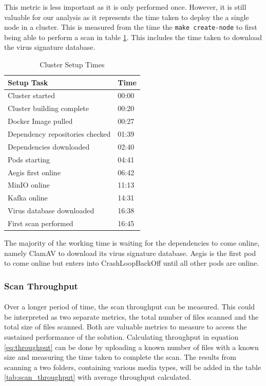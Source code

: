 \documentclass[12pt, conference, final, a4paper, onecolumn, compsoc]{IEEEtran}
\begin{document}
This metric is less important as it is only performed once. However, it is still
valuable for our analysis as it represents the time taken to deploy the a single
node in a cluster. This is measured from the time the \texttt{make create-node}
to first being able to perform a scan in table \ref{tab:setup_timings}. This
includes the time taken to download the virus signature database.

\begin{table}[H] \centering
  \begin{tabular}{|l|l|}
    \hline
    \textbf{Setup Task}             & \textbf{Time} \\ \hline
    Cluster started                 & 00:00         \\ \hline
    Cluster building complete       & 00:20         \\ \hline
    Docker Image pulled             & 00:27         \\ \hline
    Dependency repositories checked & 01:39         \\ \hline
    Dependencies downloaded         & 02:40         \\ \hline
    Pods starting                   & 04:41         \\ \hline
    Aegis first online              & 06:42         \\ \hline
    MinIO online                    & 11:13         \\ \hline
    Kafka online                    & 14:31         \\ \hline
    Virus database downloaded       & 16:38         \\ \hline
    First scan performed            & 16:45         \\ \hline
  \end{tabular}
  \caption{Cluster Setup Times}
  \label{tab:setup_timings}
\end{table}

The majority of the working time is waiting for the dependencies to come online,
namely ClamAV to download its virus signature database. Aegis is the first pod
to come online but enters into CrashLoopBackOff until all other pods are online.

\subsubsection*{Scan Throughput}
\paragraph{}
Over a longer period of time, the scan throughput can be measured. This could be
interpreted as two separate metrics, the total number of files scanned and the
total size of files scanned. Both are valuable metrics to measure to access the
sustained performance of the solution. Calculating throughput in equation
\ref{eq:throughput} can be done by uploading a known number of files with a
known size and measuring the time taken to complete the scan. The results from
scanning a two folders, containing various media types, will be added in the table
\ref{tab:scan_throughput} with average throughput calculated.
\end{document}
